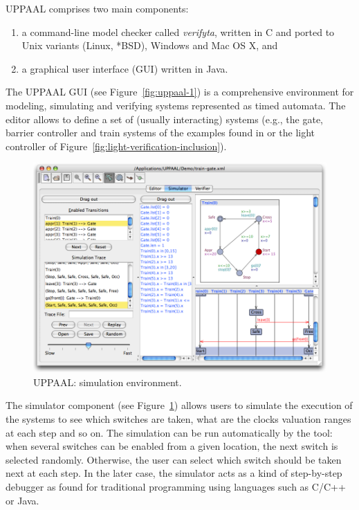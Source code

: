 UPPAAL comprises two main components:
\begin{enumerate}
  
  \item a command-line model checker called \emph{verifyta}, written in C and ported to Unix variants (Linux, *BSD), Windows and Mac OS X, and
  
  \item a graphical user interface (GUI) written in Java.
  
\end{enumerate}
The UPPAAL GUI (see Figure~\ref{fig:uppaal-1}) is a comprehensive environment for modeling, simulating and verifying systems represented as timed automata. The editor allows to define a set of (usually interacting) systems (e.g., the gate, barrier controller and train systems of the examples found in \cite{RADLD94} or the light controller of Figure~\ref{fig:light-verification-inclusion}).\\

\begin{figure}[htbp]
    \centering
    \includegraphics[width=\textwidth]{content/timed-automata/uppaal-2}
    \caption{UPPAAL: simulation environment.}
    \label{fig:uppaal-2}
\end{figure}

The simulator component (see Figure~\ref{fig:uppaal-2}) allows users to simulate the execution of the systems to see which switches are taken, what are the clocks valuation ranges at each step and so on. The simulation can be run automatically by the tool: when several switches can be enabled from a given location, the next switch is selected randomly. Otherwise, the user can select which switch should be taken next at each step. In the later case, the simulator acts as a kind of step-by-step debugger as found for traditional programming using languages such as C/C++ or Java.\\

